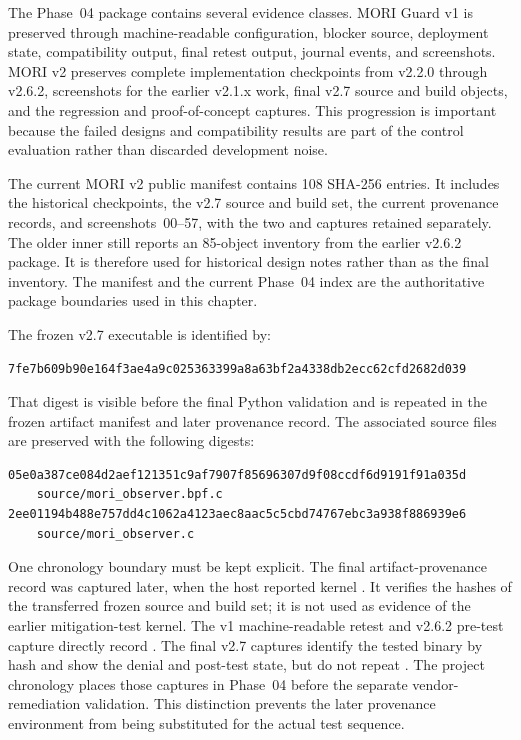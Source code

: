 The Phase~04 package contains several evidence classes. MORI Guard v1 is
preserved through machine-readable configuration, blocker source, deployment
state, compatibility output, final retest output, journal events, and
screenshots. MORI v2 preserves complete implementation checkpoints from
v2.2.0 through v2.6.2, screenshots for the earlier v2.1.x work, final v2.7
source and build objects, and the regression and proof-of-concept captures.
This progression is important because the failed designs and compatibility
results are part of the control evaluation rather than discarded development
noise.

The current MORI v2 public manifest contains 108 SHA-256 entries. It includes
the historical checkpoints, the v2.7 source and build set, the current
provenance records, and screenshots~00--57, with the two  and
 captures retained separately. The older inner
 still reports an 85-object inventory from the earlier
v2.6.2 package. It is therefore used for historical design notes rather than as
the final inventory. The manifest and the current Phase~04 index are the
authoritative package boundaries used in this chapter.

The frozen v2.7 executable is identified by:

\begin{lstlisting}
7fe7b609b90e164f3ae4a9c025363399a8a63bf2a4338db2ecc62cfd2682d039
\end{lstlisting}

That digest is visible before the final Python validation and is repeated in
the frozen artifact manifest and later provenance record. The associated
source files are preserved with the following digests:

\begin{lstlisting}
05e0a387ce084d2aef121351c9af7907f85696307d9f08ccdf6d9191f91a035d
    source/mori_observer.bpf.c
2ee01194b488e757dd4c1062a4123aec8aac5c5cbd74767ebc3a938f886939e6
    source/mori_observer.c
\end{lstlisting}

One chronology boundary must be kept explicit. The final artifact-provenance
record was captured later, when the host reported kernel
. It verifies the hashes of the transferred frozen
source and build set; it is not used as evidence of the earlier mitigation-test
kernel. The v1 machine-readable retest and v2.6.2 pre-test capture directly
record . The final v2.7 captures identify the tested
binary by hash and show the denial and post-test state, but do not repeat
. The project chronology places those captures in Phase~04 before
the separate vendor-remediation validation. This distinction prevents the
later provenance environment from being substituted for the actual test
sequence.

